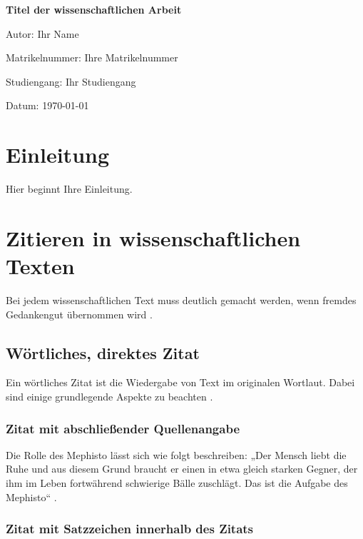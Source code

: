 \documentclass[12pt,a4paper]{article}
\begin{document}
\begin{titlepage}
    \centering
    {\Large\bfseries Titel der wissenschaftlichen Arbeit\par}
    \vspace{2cm}
    {\large Autor: Ihr Name\par}
    {\large Matrikelnummer: Ihre Matrikelnummer\par}
    {\large Studiengang: Ihr Studiengang\par}
    \vfill
    {\large Datum: \today\par}
\end{titlepage}

\tableofcontents
\thispagestyle{empty}
\newpage

\section{Einleitung}

Hier beginnt Ihre Einleitung.

\section{Zitieren in wissenschaftlichen Texten}

Bei jedem wissenschaftlichen Text muss deutlich gemacht werden, wenn fremdes Gedankengut übernommen wird \parencite[vgl.][S. 15]{Mustermann2005}.

\subsection{Wörtliches, direktes Zitat}

Ein wörtliches Zitat ist die Wiedergabe von Text im originalen Wortlaut. Dabei sind einige grundlegende Aspekte zu beachten \parencite[vgl.][S. 102]{Schmidt2004}.

\subsubsection{Zitat mit abschließender Quellenangabe}

Die Rolle des Mephisto lässt sich wie folgt beschreiben: „Der Mensch liebt die Ruhe und aus diesem Grund braucht er einen in etwa gleich starken Gegner, der ihm im Leben fortwährend schwierige Bälle zuschlägt. Das ist die Aufgabe des Mephisto“ \parencite[][S. 102]{Schmidt2004}.

\subsubsection{Zitat mit Satzzeichen innerhalb des Zitats}
\end{document}
